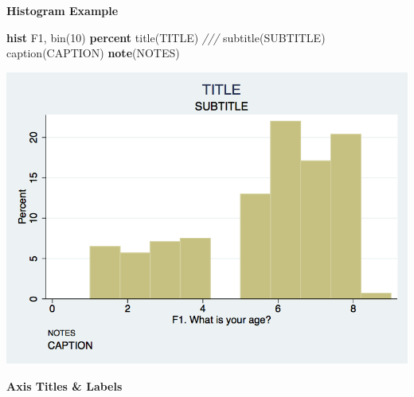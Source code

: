 \documentclass[]{book}
\newenvironment{Shaded}{\begin{snugshade}}{\end{snugshade}}
\newcommand{\BaseNTok}[1]{\textcolor[rgb]{0.00,0.00,0.81}{#1}}
\newcommand{\CommentTok}[1]{\textcolor[rgb]{0.56,0.35,0.01}{\textit{#1}}}
\newcommand{\KeywordTok}[1]{\textcolor[rgb]{0.13,0.29,0.53}{\textbf{#1}}}
\newcommand{\NormalTok}[1]{#1}
\begin{document}
\textbf{Histogram Example}

\begin{Shaded}
\begin{Highlighting}[]
  \KeywordTok{hist}\NormalTok{ F1, }\BaseNTok{bin}\NormalTok{(10) }\KeywordTok{percent} \BaseNTok{title}\NormalTok{(TITLE) }\CommentTok{///}
    \BaseNTok{subtitle}\NormalTok{(SUBTITLE) }\BaseNTok{caption}\NormalTok{(CAPTION) }\KeywordTok{note}\NormalTok{(NOTES)}
\end{Highlighting}
\end{Shaded}

\includegraphics{Stata/StataModGraph/images/hist1.png}

\textbf{Axis Titles \& Labels}
\end{document}
